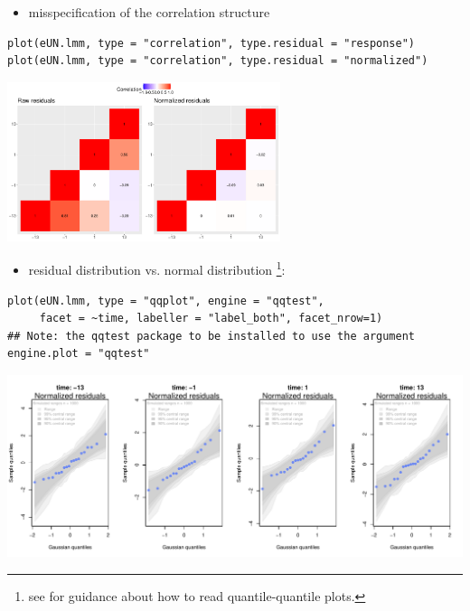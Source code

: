 \documentclass[12pt]{article}
\begin{document}
\begin{itemize}
\item misspecification of the correlation structure
\end{itemize}
\lstset{language=r,label= ,caption= ,captionpos=b,numbers=none}
\begin{lstlisting}
plot(eUN.lmm, type = "correlation", type.residual = "response")
plot(eUN.lmm, type = "correlation", type.residual = "normalized")
\end{lstlisting}

\begin{center}
\includegraphics[width=0.6\textwidth]{./figures/diag-correlation.pdf}
\end{center}

\begin{itemize}
\item residual distribution vs. normal distribution \footnote{see \cite{oldford2016self} for guidance
about how to read quantile-quantile plots.}:
\end{itemize}

\lstset{language=r,label= ,caption= ,captionpos=b,numbers=none}
\begin{lstlisting}
plot(eUN.lmm, type = "qqplot", engine = "qqtest",
     facet = ~time, labeller = "label_both", facet_nrow=1)
## Note: the qqtest package to be installed to use the argument engine.plot = "qqtest" 
\end{lstlisting}

\begin{center}
\includegraphics[width=\textwidth]{./figures/diag-qqplot.pdf}
\end{center}
\end{document}
